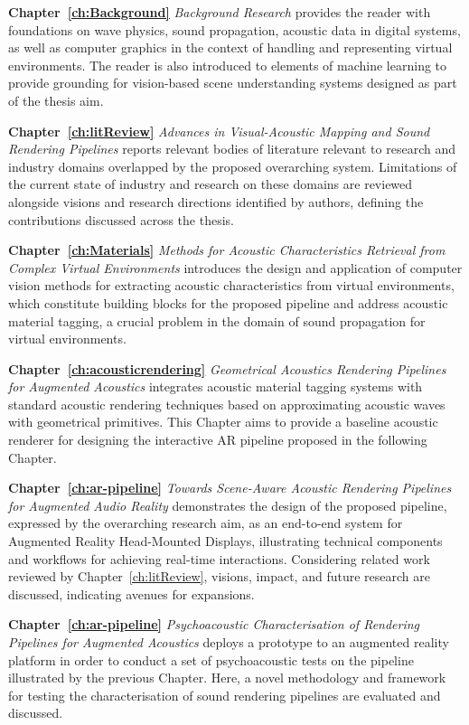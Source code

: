 \textbf{Chapter~\ref{ch:Background}} \textit{Background Research} provides the reader with foundations on wave physics, sound propagation, acoustic data in digital systems, as well as computer graphics in the context of handling and representing virtual environments. The reader is also introduced to elements of machine learning to provide grounding for vision-based scene understanding systems designed as part of the thesis aim.

\textbf{Chapter~\ref{ch:litReview}} \textit{Advances in Visual-Acoustic Mapping and Sound Rendering Pipelines} reports relevant bodies of literature relevant to research and industry domains overlapped by the proposed overarching system. Limitations of the current state of industry and research on these domains are reviewed alongside visions and research directions identified by authors, defining the contributions discussed across the thesis.

\textbf{Chapter~\ref{ch:Materials}} \textit{Methods for Acoustic Characteristics Retrieval from Complex Virtual Environments} introduces the design and application of computer vision methods for extracting acoustic characteristics from virtual environments, which constitute building blocks for the proposed pipeline and address acoustic material tagging, a crucial problem in the domain of sound propagation for virtual environments.

\textbf{Chapter~\ref{ch:acousticrendering}} \textit{Geometrical Acoustics Rendering Pipelines for Augmented Acoustics} integrates acoustic material tagging systems with standard acoustic rendering techniques based on approximating acoustic waves with geometrical primitives. This Chapter aims to provide a baseline acoustic renderer for designing the interactive AR pipeline proposed in the following Chapter.

\textbf{Chapter~\ref{ch:ar-pipeline}} \textit{Towards Scene-Aware Acoustic Rendering Pipelines for Augmented Audio Reality} demonstrates the design of the proposed pipeline, expressed by the overarching research aim, as an end-to-end system for Augmented Reality Head-Mounted Displays, illustrating technical components and workflows for achieving real-time interactions. Considering related work reviewed by Chapter~\ref{ch:litReview}, visions, impact, and future research are discussed, indicating avenues for expansions.

\textbf{Chapter~\ref{ch:ar-pipeline}} \textit{Psychoacoustic Characterisation of Rendering Pipelines for Augmented Acoustics} deploys a prototype to an augmented reality platform in order to conduct a set of psychoacoustic tests on the pipeline illustrated by the previous Chapter. Here, a novel methodology and framework for testing the characterisation of sound rendering pipelines are evaluated and discussed.

